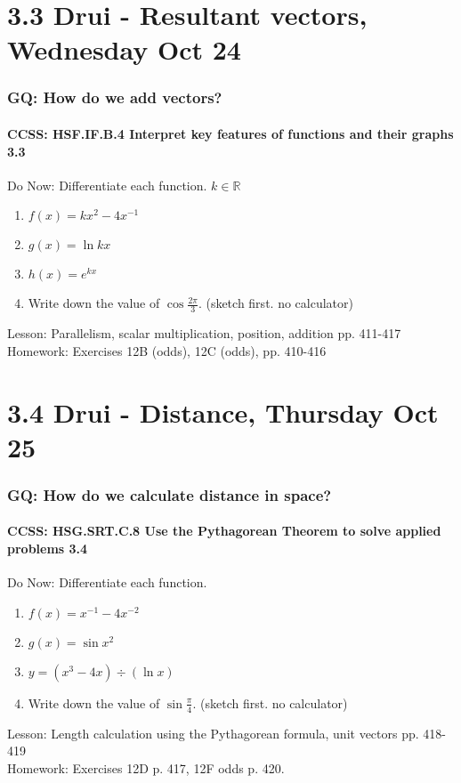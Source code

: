 \documentclass{beamer}
\begin{document}
\section{3.3 Drui - Resultant vectors, Wednesday Oct 24}
  \frame
  {
    \frametitle{GQ: How do we add vectors?}
    \framesubtitle{CCSS: HSF.IF.B.4 Interpret key features of functions and their graphs \qquad \alert{3.3}}

    \begin{block}{Do Now: Differentiate each function. $k \in \mathbb{R}$}
    \begin{enumerate}
        \item $f(x)=k x^2-4x^{-1}$
        \item $g(x)=\ln kx$
        \item $h(x)=e^{kx}$
        \item Write down the value of $\displaystyle \cos \frac{2 \pi}{3}$. (sketch first. no calculator)
    \end{enumerate}
    \end{block}
    Lesson: Parallelism, scalar multiplication, position, addition pp. 411-417\\ \bigskip
    Homework: Exercises 12B (odds), 12C (odds), pp. 410-416
  }

\section{3.4 Drui - Distance, Thursday Oct 25}
  \frame
  {
    \frametitle{GQ: How do we calculate distance in space?}
    \framesubtitle{CCSS: HSG.SRT.C.8 Use the Pythagorean Theorem to solve applied problems \qquad \alert{3.4}}

    \begin{block}{Do Now: Differentiate each function.}
    \begin{enumerate}
        \item $f(x)=x^{-1}-4x^{-2}$
        \item $g(x)=\sin x^2$
        \item $y=(x^3-4x) \div (\ln x)$
        \item Write down the value of $\displaystyle \sin \frac{\pi}{4}$. (sketch first. no calculator)
    \end{enumerate}
    \end{block}
    Lesson: Length calculation using the Pythagorean formula, unit vectors pp. 418-419\\ \bigskip
    Homework: Exercises 12D p. 417, 12F odds p. 420.
  }
\end{document}
